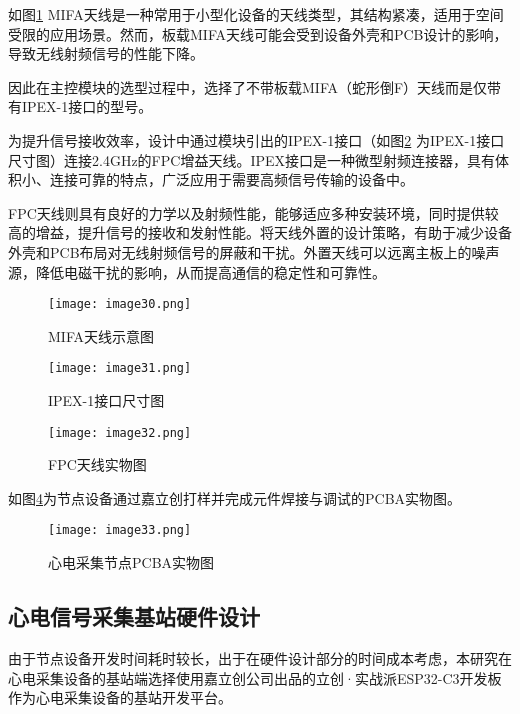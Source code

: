 如图\ref{F.ECG_image30} MIFA天线是一种常用于小型化设备的天线类型，其结构紧凑，适用于空间受限的应用场景。然而，板载MIFA天线可能会受到设备外壳和PCB设计的影响，导致无线射频信号的性能下降。

因此在主控模块的选型过程中，选择了不带板载MIFA（蛇形倒F）天线而是仅带有IPEX-1接口的型号。

为提升信号接收效率，设计中通过模块引出的IPEX-1接口（如图\ref{F.ECG_image31} 为IPEX-1接口尺寸图）连接2.4GHz的FPC增益天线。IPEX接口是一种微型射频连接器，具有体积小、连接可靠的特点，广泛应用于需要高频信号传输的设备中。

FPC天线则具有良好的力学以及射频性能，能够适应多种安装环境，同时提供较高的增益，提升信号的接收和发射性能。将天线外置的设计策略，有助于减少设备外壳和PCB布局对无线射频信号的屏蔽和干扰。外置天线可以远离主板上的噪声源，降低电磁干扰的影响，从而提高通信的稳定性和可靠性。

\begin{figure}[htb]
    \centering
    \texttt{[image: image30.png]}
    \caption{MIFA天线示意图}
    \label{F.ECG_image30}
\end{figure}

\begin{figure}[htb]
    \centering
    \texttt{[image: image31.png]}
    \caption{IPEX-1接口尺寸图\cite{IPEX-1}}
    \label{F.ECG_image31}
\end{figure}

\begin{figure}[H]
    \centering
    \texttt{[image: image32.png]}
    \caption{FPC天线实物图}
    \label{F.ECG_image32}
\end{figure}

如图\ref{F.ECG_image33}为节点设备通过嘉立创打样并完成元件焊接与调试的PCBA实物图。

\begin{figure}[htb]
    \centering
    \texttt{[image: image33.png]}
    \caption{心电采集节点PCBA实物图}
    \label{F.ECG_image33}
\end{figure}

\subsection{心电信号采集基站硬件设计}

由于节点设备开发时间耗时较长，出于在硬件设计部分的时间成本考虑，本研究在心电采集设备的基站端选择使用嘉立创公司出品的立创·实战派ESP32-C3开发板作为心电采集设备的基站开发平台。

